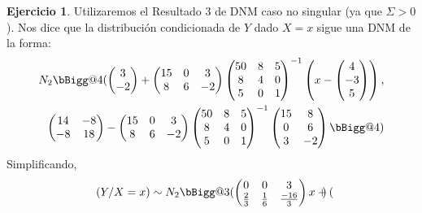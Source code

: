 \documentclass[12pt,spanish]{article}
\makeatletter
\newcommand{\vast}{\bBigg@{3}}
\newcommand{\Vast}{\bBigg@{4}}
\theoremstyle{definition}
\newtheorem{exercise}{Ejercicio}
\makeatother
\begin{document}
\begin{exercise} %
  Utilizaremos el Resultado 3 de DNM caso no singular (ya que
  $\Sigma>0$). Nos dice que la distribución condicionada de $Y$ dado
  $X=x$ sigue una DNM de la forma:
  \begin{align*}
    N_2\Vast(
    \begin{pmatrix}
      3 \\ -2
    \end{pmatrix}
    +
    \begin{pmatrix}
      15 & 0 & 3 \\
      8 & 6 & -2
    \end{pmatrix}
              \begin{pmatrix}
                50 & 8 & 5 \\
                8 & 4 & 0 \\
                5 & 0 & 1
              \end{pmatrix}^{-1}\left(x-
                        \begin{pmatrix}
                          4 \\ -3 \\ 5
                        \end{pmatrix}
    \right), \\
    \begin{pmatrix}
      14 & -8 \\
      -8 & 18 
    \end{pmatrix}-\begin{pmatrix}
      15 & 0 & 3 \\
      8 & 6 & -2
    \end{pmatrix}\begin{pmatrix}
      50 & 8 & 5 \\
      8 & 4 & 0 \\
      5 & 0 & 1
    \end{pmatrix}^{-1}
              \begin{pmatrix}
                15 & 8 \\
                0 & 6 \\
                3 & -2
              \end{pmatrix}\Vast)
  \end{align*}
  Simplificando, \[(Y/X=x)\sim N_2\vast(
    \begin{pmatrix}
      0 & 0 & 3 \\
      \frac{2}{3} & \frac{1}{6} & \frac{-16}{3}
    \end{pmatrix}x+
    \begin{pmatrix}

\end{pmatrix}\]
\end{exercise}
\end{document}
